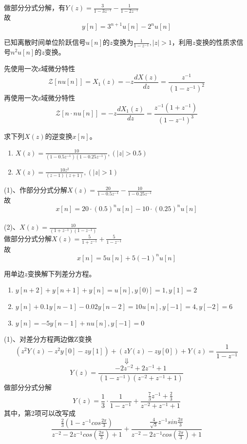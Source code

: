 \documentclass[answers]{exam}  %
\begin{document}
\begin{questions}
\begin{solution}
	做部分分式分解，有$Y(z)=\frac{3}{1-3z^{-1}}-\frac{1}{1-2z^{-1}}$\\
	故$$y[n]=3^{n+1}u[n]-2^nu[n]$$
\end{solution}
\newpage
\question 已知离散时间单位阶跃信号$u[n]$的$z$变换为$\frac{1}{1-z^{-1}},|z|>1$，利用$z$变换的性质求信号$n^2u[n]$的$z$变换。
\begin{solution}
	先使用一次z域微分特性$${\mathcal{Z}}[nu[n]]=X_1(z)=-z\frac{dX(z)}{dz}=\frac{z^{-1}}{(1-z^{-1})^2}$$
	再使用一次z域微分特性$$\mathcal{Z}[n\cdot nu[n]]=-z\frac{dX_1(z)}{dz}=\frac{z^{-1}(1+z^{-1})}{(1-z^{-1})^3}$$
\end{solution}
\newpage
\question 求下列$X(z)$的逆变换$x[n]$。
\begin{enumerate}[(1)]
\item $X(z)=\frac{10}{(1-0.5z^{-1})(1-0.25z^{-1})},(|z|>0.5)$
\item $X(z)=\frac{10z^2}{(z-1)(z+1)},(|z|>1)$
\end{enumerate}
\begin{solution}
	(1)、作部分分式分解$X(z)=\frac{20}{1-0.5z^{-1}}-\frac{10}{1-0.25z^{-1}}$\\
	故$$x[n]=20\cdot(0.5)^nu[n]-10\cdot(0.25)^nu[n]$$
	~\\
	(2)、$X(z)=\frac{10}{(1+z^{-1})(1-z^{-1})}$\\
	做部分分式分解$X(z)=\frac{5}{1+z^{-1}}+\frac{5}{1-z^{-1}}$\\
	故$$x[n]=5u[n]+5(-1)^nu[n]$$
\end{solution}
\newpage
\question 用单边$z$变换解下列差分方程。
\begin{enumerate}[(1)]
\item $y[n+2]+y[n+1]+y[n]=u[n],y[0)]=1,y[1]=2$
\item $y[n]+0.1y[n-1]-0.02y[n-2]=10u[n],y[-1]=4,y[-2]=6$
\item $y[n]=-5y[n-1]+nu[n],y[-1]=0$
\end{enumerate}
\begin{solution}
	(1)、对差分方程两边做Z变换\\
	$$(z^2Y(z)-z^2y[0]-zy[1])+(zY(z)-zy[0])+Y(z)=\frac{1}{1-z^{-1}}$$
	$$\Downarrow$$
	$$Y(z)=\frac{-2z^{-2}+2z^{-1}+1}{(1-z^{-1})(z^{-2}+z^{-1}+1)}$$
	做部分分式分解
	$$Y(z)=\frac{1}{3}\cdot\frac{1}{1-z^{-1}}+\frac{\frac{7}{3}z^{-1}+\frac{2}{3}}{z^{-2}+z^{-1}+1}$$
	其中，第2项可以改写成$$\frac{\frac{2}{3}(1-z^{-1}cos\frac{2\pi}{3})}{z^{-2}-2z^{-1}cos(\frac{2\pi}{3})+1}+\frac{\frac{4}{\sqrt{3}}z^{-1}sin\frac{2\pi}{3}}{z^{-2}-2z^{-1}cos(\frac{2\pi}{3})+1}$$

\end{solution}
\end{questions}
\end{document}
